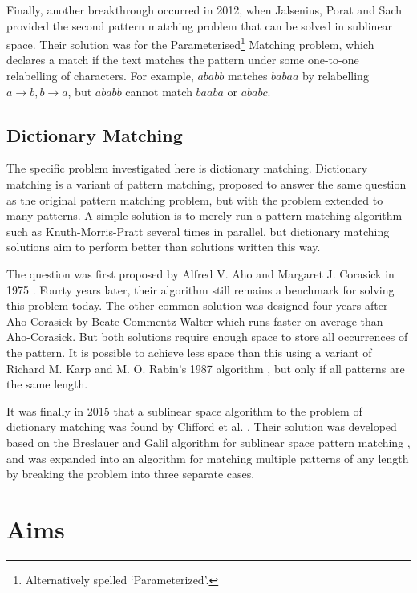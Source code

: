 \documentclass[ %
                    author={Dominic Joseph Moylett},
                    degree={MEng},
                     title={Dictionary Matching with Fingerprints},
                  subtitle={An Empirical Analysis},
                      type={research},
                      year={2015} ]{dissertation}
\begin{document}
Finally, another breakthrough occurred in 2012, when Jalsenius, Porat and Sach \cite{JPS:2013} provided the second pattern matching problem that can be solved in sublinear space. Their solution was for the Parameterised\footnote{Alternatively spelled `Parameterized'.} Matching problem, which declares a match if the text matches the pattern under some one-to-one relabelling of characters. For example, $ababb$ matches $babaa$ by relabelling $a \to b, b \to a$, but $ababb$ cannot match $baaba$ or $ababc$.

\subsection{Dictionary Matching}

The specific problem investigated here is dictionary matching. Dictionary matching is a variant of pattern matching, proposed to answer the same question as the original pattern matching problem, but with the problem extended to many patterns. A simple solution is to merely run a pattern matching algorithm such as Knuth-Morris-Pratt several times in parallel, but dictionary matching solutions aim to perform better than solutions written this way.

The question was first proposed by Alfred V. Aho and Margaret J. Corasick in 1975 \cite{Aho:1975:ESM:360825.360855}. Fourty years later, their algorithm still remains a benchmark for solving this problem today. The other common solution was designed four years after Aho-Corasick by Beate Commentz-Walter \cite{commentz-walter:algo} which runs faster on average than Aho-Corasick. But both solutions require enough space to store all occurrences of the pattern. It is possible to achieve less space than this using a variant of Richard M. Karp and M. O. Rabin's 1987 algorithm \cite{5390135}, but only if all patterns are the same length.

It was finally in 2015 that a sublinear space algorithm to the problem of dictionary matching was found by Clifford et al. \cite{2015arXiv150406242C}. Their solution was developed based on the Breslauer and Galil algorithm for sublinear space pattern matching \cite{Breslauer:2014:RSS:2660854.2635814}, and was expanded into an algorithm for matching multiple patterns of any length by breaking the problem into three separate cases.

\section{Aims}
\end{document}

